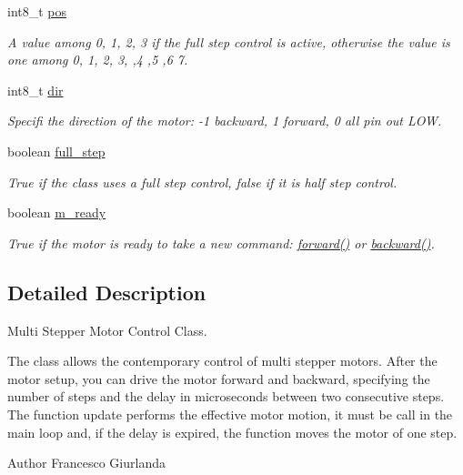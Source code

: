 \begin{DoxyCompactItemize}
int8\+\_\+t \hyperlink{class_s_motor_a994ea15ba154ccf166cdfefebae493bd}{pos}
\begin{DoxyCompactList}\small\item\em A value among 0, 1, 2, 3 if the full step control is active, otherwise the value is one among 0, 1, 2, 3, ,4 ,5 ,6 7. \end{DoxyCompactList}\item 
int8\+\_\+t \hyperlink{class_s_motor_ad5bca9af6abc32a4c501ab8791c9b044}{dir}
\begin{DoxyCompactList}\small\item\em Specifi the direction of the motor\+: -\/1 backward, 1 forward, 0 all pin out L\+O\+W. \end{DoxyCompactList}\item 
boolean \hyperlink{class_s_motor_a91a0e1b7858e925219aef3f01581a6df}{full\+\_\+step}
\begin{DoxyCompactList}\small\item\em True if the class uses a full step control, false if it is half step control. \end{DoxyCompactList}\item 
boolean \hyperlink{class_s_motor_a387fdb2f979f0a98629f60e6d39e88eb}{m\+\_\+ready}
\begin{DoxyCompactList}\small\item\em True if the motor is ready to take a new command\+: \hyperlink{class_s_motor_ae266c2af254d76012b8132bb7641628d}{forward()} or \hyperlink{class_s_motor_a9d666d613dffcc324e0ae6e1e0a31a3f}{backward()}. \end{DoxyCompactList}\end{DoxyCompactItemize}


\subsection{Detailed Description}
Multi Stepper Motor Control Class. 

The class allows the contemporary control of multi stepper motors. After the motor setup, you can drive the motor forward and backward, specifying the number of steps and the delay in microseconds between two consecutive steps. The function update performs the effective motor motion, it must be call in the main loop and, if the delay is expired, the function moves the motor of one step. \begin{DoxyAuthor}{Author}
Francesco Giurlanda 
\end{DoxyAuthor}


